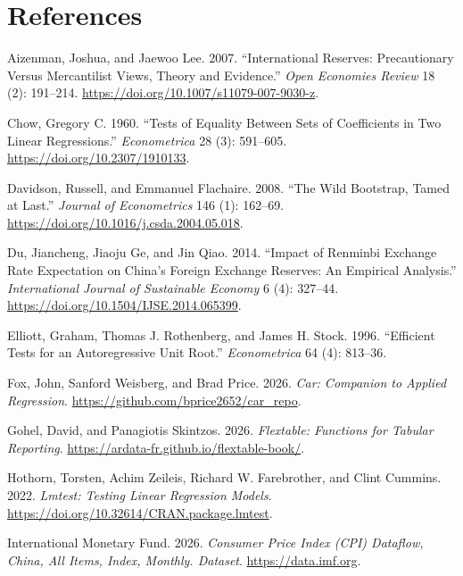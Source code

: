 \documentclass[
  12pt,
  a4paper,
]{article}
\newlength{\cslhangindent}
\newenvironment{CSLReferences}[2] %
 {\begin{list}{}{%
  \setlength{\itemindent}{0pt}
  \setlength{\leftmargin}{0pt}
  \setlength{\parsep}{0pt}
  \ifodd #1
   \setlength{\leftmargin}{\cslhangindent}
   \setlength{\itemindent}{-1\cslhangindent}
  \fi
  \setlength{\itemsep}{#2\baselineskip}}}
 {\end{list}}
\begin{document}
\section*{References}\label{references}

\protect{}\label{refs}
\begin{CSLReferences}{1}{1}
Aizenman, Joshua, and Jaewoo Lee. 2007. {``International Reserves:
Precautionary Versus Mercantilist Views, Theory and Evidence.''}
\emph{Open Economies Review} 18 (2): 191--214.
\url{https://doi.org/10.1007/s11079-007-9030-z}.

Chow, Gregory C. 1960. {``Tests of Equality Between Sets of Coefficients
in Two Linear Regressions.''} \emph{Econometrica} 28 (3): 591--605.
\url{https://doi.org/10.2307/1910133}.

Davidson, Russell, and Emmanuel Flachaire. 2008. {``The Wild Bootstrap,
Tamed at Last.''} \emph{Journal of Econometrics} 146 (1): 162--69.
\url{https://doi.org/10.1016/j.csda.2004.05.018}.

Du, Jiancheng, Jiaoju Ge, and Jin Qiao. 2014. {``Impact of Renminbi
Exchange Rate Expectation on China's Foreign Exchange Reserves: An
Empirical Analysis.''} \emph{International Journal of Sustainable
Economy} 6 (4): 327--44. \url{https://doi.org/10.1504/IJSE.2014.065399}.

Elliott, Graham, Thomas J. Rothenberg, and James H. Stock. 1996.
{``Efficient Tests for an Autoregressive Unit Root.''}
\emph{Econometrica} 64 (4): 813--36.

Fox, John, Sanford Weisberg, and Brad Price. 2026. \emph{Car: Companion
to Applied Regression}. \url{https://github.com/bprice2652/car_repo}.

Gohel, David, and Panagiotis Skintzos. 2026. \emph{Flextable: Functions
for Tabular Reporting}.
\url{https://ardata-fr.github.io/flextable-book/}.

Hothorn, Torsten, Achim Zeileis, Richard W. Farebrother, and Clint
Cummins. 2022. \emph{Lmtest: Testing Linear Regression Models}.
\url{https://doi.org/10.32614/CRAN.package.lmtest}.

International Monetary Fund. 2026. \emph{Consumer Price Index (CPI)
Dataflow, China, All Items, Index, Monthly. Dataset}.
\url{https://data.imf.org}.


\end{CSLReferences}
\end{document}
